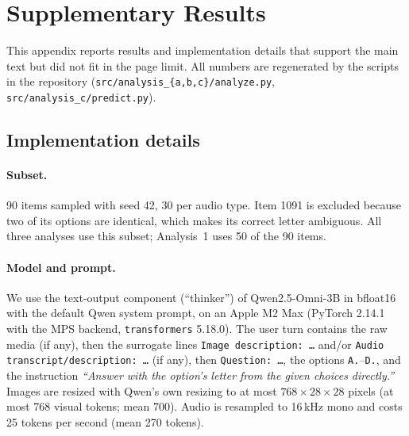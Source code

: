 
\section{Supplementary Results}
\label{app:results}

This appendix reports results and implementation details that support the main
text but did not fit in the page limit. All numbers are regenerated by the
scripts in the repository (\texttt{src/analysis\_\{a,b,c\}/analyze.py},
\texttt{src/analysis\_c/predict.py}).

\subsection{Implementation details}
\label{app:impl}

\paragraph{Subset.} 90 items sampled with seed 42, 30 per audio type. Item 1091
is excluded because two of its options are identical, which makes its correct
letter ambiguous. All three analyses use this subset; Analysis~1 uses 50 of the
90 items.

\paragraph{Model and prompt.} We use the text-output component (``thinker'') of
Qwen2.5-Omni-3B in bfloat16 with the default Qwen system prompt, on an Apple M2
Max (PyTorch 2.14.1 with the MPS backend, \texttt{transformers} 5.18.0). The user
turn contains the raw media (if any), then the surrogate lines
\texttt{Image description:~\ldots} and/or \texttt{Audio transcript/description:~\ldots}
(if any), then \texttt{Question:~\ldots}, the options \texttt{A.}--\texttt{D.}, and
the instruction \emph{``Answer with the option's letter from the given choices
directly.''} Images are resized with Qwen's own resizing to at most
$768\times28\times28$ pixels (at most 768 visual tokens; mean 700). Audio is
resampled to 16\,kHz mono and costs 25 tokens per second (mean 270 tokens).

